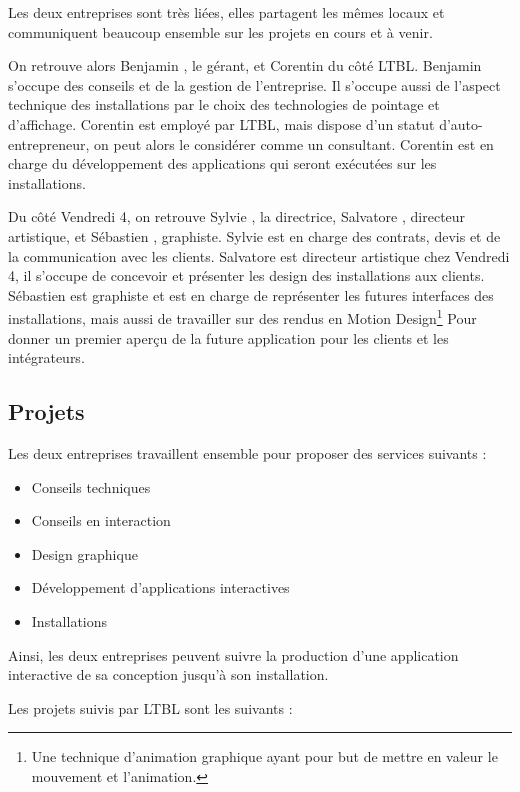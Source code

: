 Les deux entreprises sont très liées, elles partagent les mêmes locaux et communiquent beaucoup ensemble sur les projets en cours et à venir.

On retrouve alors Benjamin , le gérant, et Corentin  du côté LTBL.
Benjamin s'occupe des conseils et de la gestion de l'entreprise.
Il s'occupe aussi de l'aspect technique des installations par le choix des technologies de pointage et d'affichage.
Corentin est employé par LTBL, mais dispose d'un statut d'auto-entrepreneur, on peut alors le considérer comme un consultant.
Corentin est en charge du développement des applications qui seront exécutées sur les installations.

Du côté Vendredi 4, on retrouve Sylvie , la directrice, Salvatore , directeur artistique, et Sébastien , graphiste.
Sylvie est en charge des contrats, devis et de la communication avec les clients.
Salvatore est directeur artistique chez Vendredi 4, il s'occupe de concevoir et présenter les design des installations aux clients.
Sébastien est graphiste et est en charge de représenter les futures interfaces des installations, mais aussi de travailler sur des rendus en Motion Design\footnote{Une technique d'animation graphique ayant pour but de mettre en valeur le mouvement et l'animation.} Pour donner un premier aperçu de la future application pour les clients et les intégrateurs.

\subsection{Projets}

Les deux entreprises travaillent ensemble pour proposer des services suivants :

\begin{itemize}
    \item Conseils techniques
    \item Conseils en interaction
    \item Design graphique
    \item Développement d'applications interactives
    \item Installations
\end{itemize}

Ainsi, les deux entreprises peuvent suivre la production d'une application interactive de sa conception jusqu'à son installation.

\medskip

Les projets suivis par LTBL sont les suivants :

